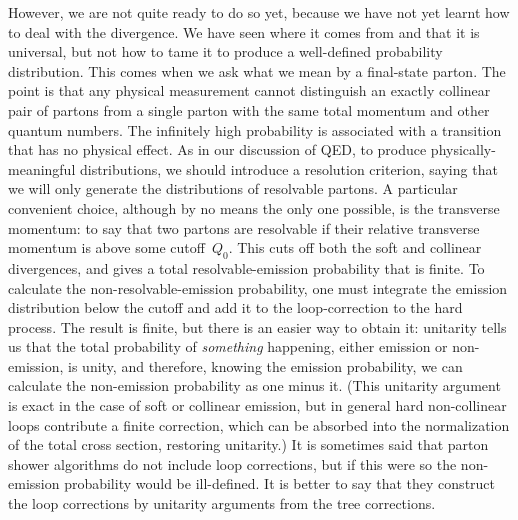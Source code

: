 However, we are not quite ready to do so yet, because we have not yet
learnt how to deal with the divergence.  We have seen where it comes
from and that it is universal, but not how to tame it to produce a
well-defined probability distribution.  This comes when we ask what we
mean by a final-state parton.  The point is that any physical
measurement cannot distinguish an exactly collinear pair of partons from
a single parton with the same total momentum and other quantum numbers.
The infinitely high probability is associated with a transition that has
no physical effect.  As in our discussion of QED, to produce
physically-meaningful distributions, we should introduce a resolution
criterion, saying that we will only generate the distributions of
resolvable partons.  A particular convenient choice, although by no
means the only one possible, is the transverse momentum: to say that two
partons are resolvable if their relative transverse momentum is above
some cutoff~$Q_0$.  This cuts off both the soft and collinear
divergences, and gives a total resolvable-emission probability that is
finite.  To calculate the non-resolvable-emission probability, one must
integrate the emission distribution below the cutoff and add it to the
loop-correction to the hard process.  The result is finite, but there is
an easier way to obtain it: unitarity tells us that the total
probability of \emph{something\/} happening, either emission or
non-emission, is unity, and therefore, knowing the emission probability,
we can calculate the non-emission probability as one minus it.  (This
unitarity argument is exact in the case of soft or collinear emission,
but in general hard non-collinear loops contribute a finite correction,
which can be absorbed into the normalization of the total cross section,
restoring unitarity.)
It is sometimes said that parton shower algorithms do not include loop
corrections, but if this were so the non-emission probability would be
ill-defined.  It is better to say that they construct the loop
corrections by unitarity arguments from the tree corrections.

